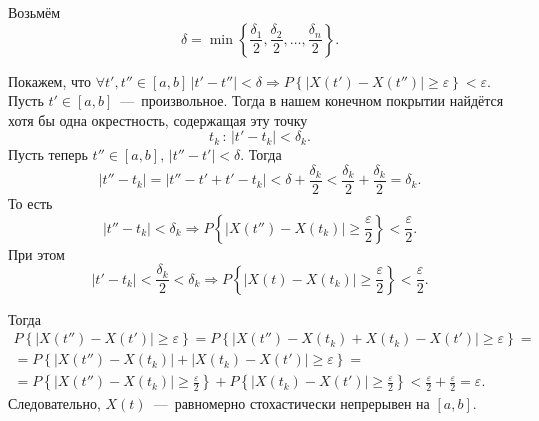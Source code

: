 Возьмём
\begin{equation*}
  \delta =
  \min \left\{ \frac{ \delta_1}{2}, \frac{ \delta_2}{2}, \dotsc, \frac{ \delta_n}{2} \right\}.
\end{equation*}

Покажем, что
$ \forall t', t'' \in \left[ a, b \right] \,
  \left| t' - t'' \right| < \delta \Rightarrow
  P \left\{ \left| X \left( t' \right) - X \left( t'' \right) \right| \geq \varepsilon \right\} <
  \varepsilon $.
Пусть $t' \in \left[ a, b \right] $~---~произвольное.
Тогда в нашем конечном покрытии найдётся хотя бы одна окрестность, содержащая эту точку
\begin{equation*}
  t_k \, : \,
  \left| t' - t_k \right| < \delta_k.
\end{equation*}
Пусть теперь $t'' \in \left[ a, b \right], \, \left| t'' - t' \right| < \delta $.
Тогда
\begin{equation*}
  \left| t'' - t_k \right| =
  \left| t'' - t' + t' - t_k \right| <
  \delta + \frac{ \delta_k}{2} <
  \frac{ \delta_k}{2} + \frac{ \delta_k}{2} =
  \delta_k.
\end{equation*}
То есть
\begin{equation*}
  \left| t'' - t_k \right| < \delta_k \Rightarrow
  P \left\{
    \left| X \left( t'' \right) - X \left( t_k \right) \right| \geq \frac{ \varepsilon }{2}
  \right\} < \frac{ \varepsilon }{2}.
\end{equation*}
При этом
\begin{equation*}
  \left| t' - t_k \right| < \frac{ \delta_k }{2} < \delta_k \Rightarrow
  P \left\{
    \left| X \left( t \right) - X \left( t_k \right) \right| \geq \frac{ \varepsilon }{2} \right\} <
  \frac{ \varepsilon }{2}.
\end{equation*}

Тогда
\begin{gather*}
  P \left\{ \left| X \left( t'' \right) - X \left( t' \right) \right| \geq \varepsilon \right\} =
  P \left\{
    \left|
      X \left( t'' \right) - X \left( t_k \right) + X \left( t_k \right) - X \left( t' \right)
    \right| \geq \varepsilon \right\} = \\
  = P \left\{
    \left| X \left( t'' \right) - X \left( t_k \right) \right| +
    \left| X \left( t_k \right) - X \left( t' \right) \right| \geq
    \varepsilon \right\} = \\
  = P \left\{
    \left| X \left( t'' \right) - X \left( t_k \right) \right| \geq \frac{\varepsilon }{2}
  \right\} +
  P \left\{
    \left| X \left( t_k \right) - X \left( t' \right) \right| \geq \frac{ \varepsilon }{2}
  \right\} <
  \frac{ \varepsilon }{2} + \frac{ \varepsilon }{2} =
  \varepsilon.
\end{gather*}
Следовательно,
$X \left( t \right) $~---~равномерно стохастически непрерывен на $ \left[ a, b \right] $.

